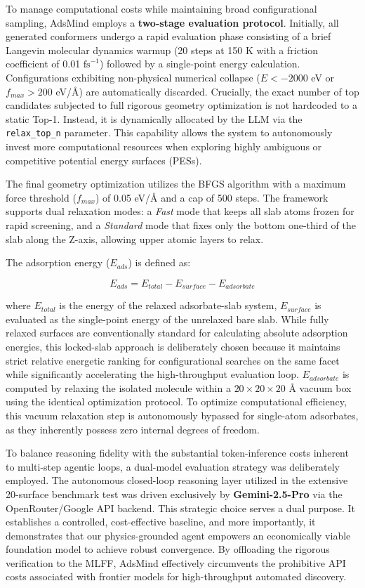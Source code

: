 \documentclass{article}
\begin{document}
To manage computational costs while maintaining broad configurational sampling, AdsMind employs a \textbf{two-stage evaluation protocol}. Initially, all generated conformers undergo a rapid evaluation phase consisting of a brief Langevin molecular dynamics warmup (20 steps at 150 K with a friction coefficient of 0.01 $\text{fs}^{-1}$) followed by a single-point energy calculation. Configurations exhibiting non-physical numerical collapse ($E < -2000$ eV or $f_{max} > 200$ eV/\AA{}) are automatically discarded. Crucially, the exact number of top candidates subjected to full rigorous geometry optimization is not hardcoded to a static Top-1. Instead, it is dynamically allocated by the LLM via the \texttt{relax\_top\_n} parameter. This capability allows the system to autonomously invest more computational resources when exploring highly ambiguous or competitive potential energy surfaces (PESs).

The final geometry optimization utilizes the BFGS algorithm with a maximum force threshold ($f_{max}$) of 0.05 eV/\AA{} and a cap of 500 steps. The framework supports dual relaxation modes: a \textit{Fast} mode that keeps all slab atoms frozen for rapid screening, and a \textit{Standard} mode that fixes only the bottom one-third of the slab along the Z-axis, allowing upper atomic layers to relax.

The adsorption energy ($E_{ads}$) is defined as:

\begin{equation}E_{ads} = E_{total} - E_{surface} - E_{adsorbate}
\end{equation}

where $E_{total}$ is the energy of the relaxed adsorbate-slab system, $E_{surface}$ is evaluated as the single-point energy of the unrelaxed bare slab. While fully relaxed surfaces are conventionally standard for calculating absolute adsorption energies, this locked-slab approach is deliberately chosen because it maintains strict relative energetic ranking for configurational searches on the same facet while significantly accelerating the high-throughput evaluation loop. $E_{adsorbate}$ is computed by relaxing the isolated molecule within a $20 \times 20 \times 20$ \AA{} vacuum box using the identical optimization protocol. To optimize computational efficiency, this vacuum relaxation step is autonomously bypassed for single-atom adsorbates, as they inherently possess zero internal degrees of freedom.

To balance reasoning fidelity with the substantial token-inference costs inherent to multi-step agentic loops, a dual-model evaluation strategy was deliberately employed. The autonomous closed-loop reasoning layer utilized in the extensive 20-surface benchmark test was driven exclusively by \textbf{Gemini-2.5-Pro} via the OpenRouter/Google API backend. This strategic choice serves a dual purpose. It establishes a controlled, cost-effective baseline, and more importantly, it demonstrates that our physics-grounded agent empowers an economically viable foundation model to achieve robust convergence. By offloading the rigorous verification to the MLFF, AdsMind effectively circumvents the prohibitive API costs associated with frontier models for high-throughput automated discovery. 
\end{document}
